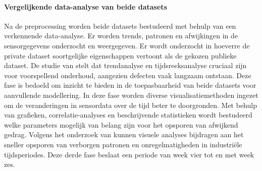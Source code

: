 
\paragraph{Vergelijkende data-analyse van beide datasets}

Na de preprocessing worden beide datasets bestudeerd met behulp van een verkennende data-analyse. Er worden trends, patronen en afwijkingen in de sensorgegevens onderzocht en weergegeven. Er wordt onderzocht in hoeverre de private dataset soortgelijke eigenschappen vertoont als de gekozen publieke dataset. De studie van \textcite{Xue2025} stelt dat trendanalyse en tijdsreeksanalyse cruciaal zijn voor voorspellend onderhoud, aangezien defecten vaak langzaam ontstaan. Deze fase is bedoeld om inzicht te bieden in de toepasbaarheid van beide datasets voor aanvullende modellering. In deze fase worden diverse visualisatiemethoden ingezet om de veranderingen in sensordata over de tijd beter te doorgronden. Met behulp van grafieken, correlatie-analyses en beschrijvende statistieken wordt bestudeerd welke parameters mogelijk van belang zijn voor het opsporen van afwijkend gedrag. Volgens het onderzoek van \textcite{Dissem2024} kunnen visuele analyses bijdragen aan het sneller opsporen van verborgen patronen en onregelmatigheden in industriële tijdsperiodes. Deze derde fase beslaat een periode van week vier tot en met week zes. 


